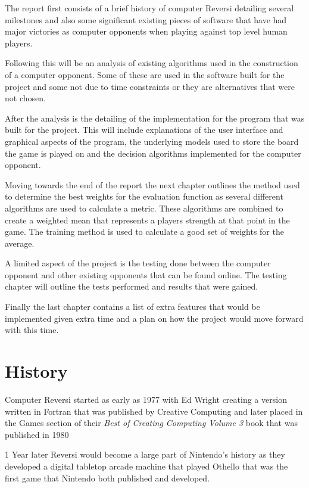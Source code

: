 \documentclass[final]{cmpreport}
\begin{document}
The report first consists of a brief history of computer Reversi detailing several milestones and also some significant existing pieces of software that have had major victories as computer opponents when playing against top level human players. 

Following this will be an analysis of existing algorithms used in the construction of a computer opponent. Some of these are used in the software built for the project and some not due to time constraints or they are alternatives that were not chosen.

After the analysis is the detailing of the implementation for the program that was built for the project. This will include explanations of the user interface and graphical aspects of the program, the underlying models used to store the board the game is played on and the decision algorithms implemented for the computer opponent.

Moving towards the end of the report the next chapter outlines the method used to determine the best weights for the evaluation function as several different algorithms are used to calculate a metric. These algorithms are combined to create a weighted mean that represents a players strength at that point in the game. The training method is used to calculate a good set of weights for the average.

A limited aspect of the project is the testing done between the computer opponent and other existing opponents that can be found online. The testing chapter will outline the tests performed and results that were gained.

Finally the last chapter contains a list of extra features that would be implemented given extra time and a plan on how the project would move forward with this time.
\section{History} 
Computer Reversi started as early as 1977 with Ed Wright creating a version written in Fortran that was published by Creative Computing \cite{Othello23:online} and later placed in the Games section of their \textit{Best of Creating Computing Volume 3} book that was published in 1980 \citet{TableofC3:online}

1 Year later Reversi would become a large part of Nintendo's history as they developed a digital tabletop arcade machine that played Othello that was the first game that Nintendo both published and developed.
\end{document}
